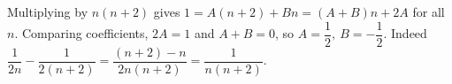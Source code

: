 Multiplying by $n(n+2)$ gives $1=A(n+2)+Bn=(A+B)n+2A$ for all $n$. Comparing coefficients, $2A=1$ and $A+B=0$, so $\boxed{A=\dfrac{1}{2},\ B=-\dfrac{1}{2}}$. Indeed $\dfrac{1}{2n}-\dfrac{1}{2(n+2)}=\dfrac{(n+2)-n}{2n(n+2)}=\dfrac{1}{n(n+2)}$.
